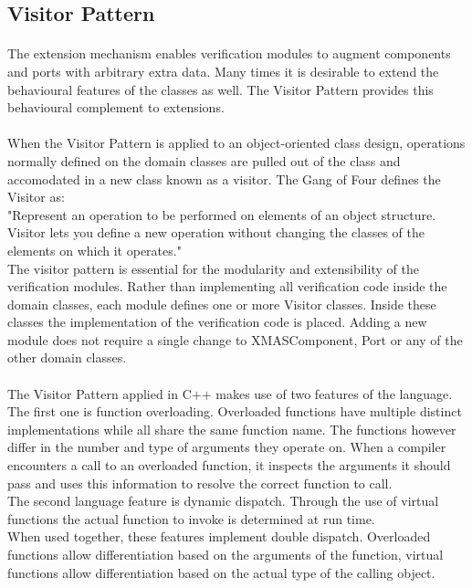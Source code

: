 \documentclass[a4paper,11pt]{article}
\begin{document}
\subsection{Visitor Pattern}

\paragraph{}
The extension mechanism enables verification modules to augment components and ports with
arbitrary extra data. Many times it is desirable to extend the behavioural features of the
classes as well. The Visitor Pattern provides this behavioural complement to extensions.

\paragraph{}
When the Visitor Pattern is applied to an object-oriented class design, operations normally
defined on the domain classes are pulled out of the class and accomodated in a new class
known as a visitor. The Gang of Four defines the Visitor as:\\"Represent an operation to be
performed on elements of an object structure. Visitor lets you define a new operation without
changing the classes of the elements on which it operates."\cite{wiki-visitor-pattern}\\
The visitor pattern is essential for the modularity and extensibility of the verification
modules. Rather than implementing all verification code inside the domain classes, each
module defines one or more Visitor classes. Inside these classes the implementation of
the verification code is placed. Adding a new module does not require a single change to
XMASComponent, Port or any of the other domain classes.

\paragraph{}
The Visitor Pattern applied in C++ makes use of two features of the language. The first one
is function overloading. Overloaded functions have multiple distinct implementations while
all share the same function name. The functions however differ in the number and type
of arguments they operate on. When a compiler encounters a call to an overloaded function,
it inspects the arguments it should pass and uses this information to resolve the correct
function to call.\\
The second language feature is dynamic dispatch. Through the use of virtual functions the
actual function to invoke is determined at run time.\\
When used together, these features implement double dispatch. Overloaded functions allow
differentiation based on the arguments of the function, virtual functions allow differentiation
based on the actual type of the calling object.
\nocite{stroustrup}
\end{document}
